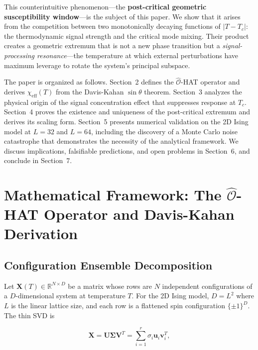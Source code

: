 \documentclass[aps,prl,twocolumn,superscriptaddress,byrevtex]{article}
\begin{document}
This counterintuitive phenomenon---the \textbf{post-critical geometric susceptibility window}---is the subject of this paper. We show that it arises from the competition between two monotonically decaying functions of $|T - T_c|$: the thermodynamic signal strength and the critical mode mixing. Their product creates a geometric extremum that is not a new phase transition but a \emph{signal-processing resonance}---the temperature at which external perturbations have maximum leverage to rotate the system's principal subspace.

The paper is organized as follows. Section~2 defines the $\hat{\mathcal{O}}$-HAT operator and derives $\chi_{\text{eff}}(T)$ from the Davis-Kahan $\sin\theta$ theorem. Section~3 analyzes the physical origin of the signal concentration effect that suppresses response at $T_c$. Section~4 proves the existence and uniqueness of the post-critical extremum and derives its scaling form. Section~5 presents numerical validation on the 2D Ising model at $L=32$ and $L=64$, including the discovery of a Monte Carlo noise catastrophe that demonstrates the necessity of the analytical framework. We discuss implications, falsifiable predictions, and open problems in Section~6, and conclude in Section~7.

\section{Mathematical Framework: The \texorpdfstring{$\hat{\mathcal{O}}$-HAT}{Ô-HAT} Operator and Davis-Kahan Derivation}

\subsection{Configuration Ensemble Decomposition}

Let $\mathbf{X}(T) \in \mathbb{R}^{N \times D}$ be a matrix whose rows are $N$ independent configurations of a $D$-dimensional system at temperature $T$. For the 2D Ising model, $D = L^2$ where $L$ is the linear lattice size, and each row is a flattened spin configuration $\{\pm 1\}^D$. The thin SVD is

\begin{equation}
\mathbf{X} = \mathbf{U}\boldsymbol{\Sigma}\mathbf{V}^T = \sum_{i=1}^{r} \sigma_i \mathbf{u}_i \mathbf{v}_i^T,
\label{eq:svd}
\end{equation}
\end{document}
